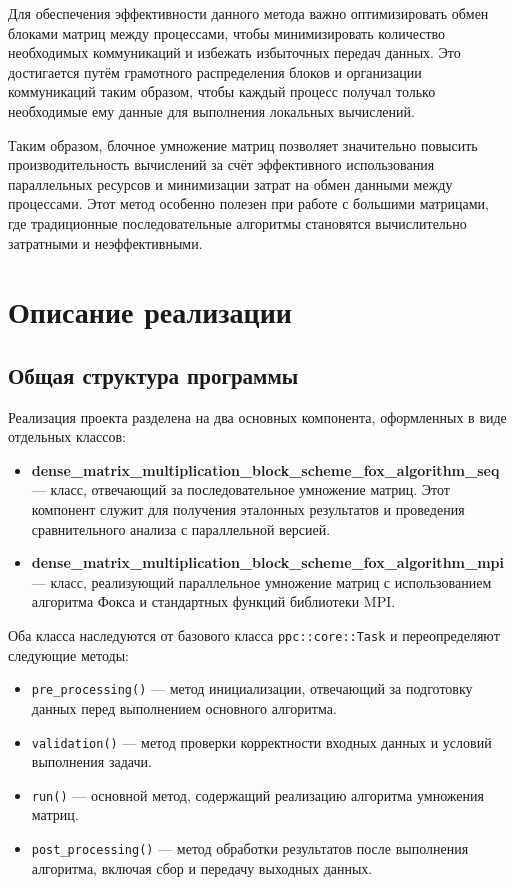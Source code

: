 \documentclass{report}
\begin{document}
Для обеспечения эффективности данного метода важно оптимизировать обмен блоками матриц между процессами, чтобы минимизировать количество необходимых коммуникаций и избежать избыточных передач данных. Это достигается путём грамотного распределения блоков и организации коммуникаций таким образом, чтобы каждый процесс получал только необходимые ему данные для выполнения локальных вычислений.

Таким образом, блочное умножение матриц позволяет значительно повысить производительность вычислений за счёт эффективного использования параллельных ресурсов и минимизации затрат на обмен данными между процессами. Этот метод особенно полезен при работе с большими матрицами, где традиционные последовательные алгоритмы становятся вычислительно затратными и неэффективными.

\section*{Описание реализации}

\subsection*{Общая структура программы}

Реализация проекта разделена на два основных компонента, оформленных в виде отдельных классов:

\begin{itemize}
    \item \textbf{dense\_matrix\_multiplication\_block\_scheme\_fox\_algorithm\_seq} — класс, отвечающий за последовательное умножение матриц. Этот компонент служит для получения эталонных результатов и проведения сравнительного анализа с параллельной версией.
    
    \item \textbf{dense\_matrix\_multiplication\_block\_scheme\_fox\_algorithm\_mpi} — класс, реализующий параллельное умножение матриц с использованием алгоритма Фокса и стандартных функций библиотеки MPI.
\end{itemize}

Оба класса наследуются от базового класса \texttt{ppc::core::Task} и переопределяют следующие методы:

\begin{itemize}
    \item \texttt{pre\_processing()} — метод инициализации, отвечающий за подготовку данных перед выполнением основного алгоритма.
    
    \item \texttt{validation()} — метод проверки корректности входных данных и условий выполнения задачи.
    
    \item \texttt{run()} — основной метод, содержащий реализацию алгоритма умножения матриц.
    
    \item \texttt{post\_processing()} — метод обработки результатов после выполнения алгоритма, включая сбор и передачу выходных данных.
\end{itemize}
\end{document}
